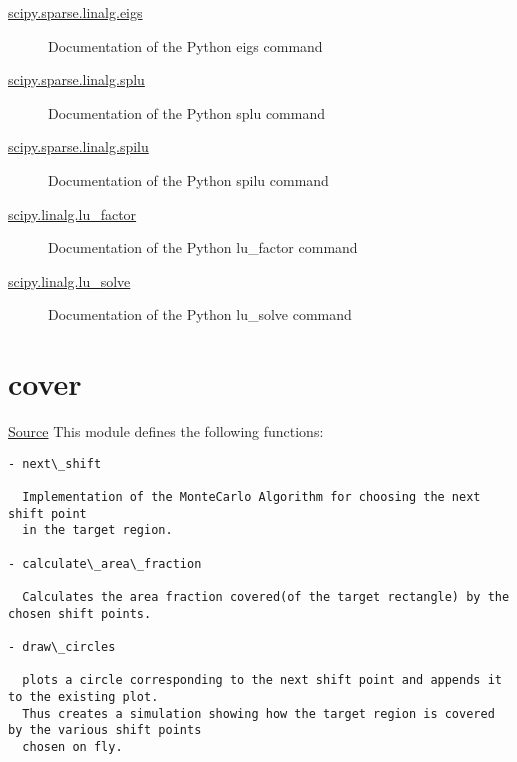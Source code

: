 \documentclass[letterpaper,10pt,english]{sphinxmanual}
\begin{document}
\begin{description}
\item[{\href{http://docs.scipy.org/doc/scipy-0.14.0/reference/generated/scipy.sparse.linalg.eigs.html}{scipy.sparse.linalg.eigs}}] \leavevmode
Documentation of the Python eigs command

\item[{\href{http://docs.scipy.org/doc/scipy-0.14.0/reference/generated/scipy.sparse.linalg.splu.html}{scipy.sparse.linalg.splu}}] \leavevmode
Documentation of the Python splu command

\item[{\href{http://docs.scipy.org/doc/scipy-0.14.0/reference/generated/scipy.sparse.linalg.spilu.html}{scipy.sparse.linalg.spilu}}] \leavevmode
Documentation of the Python spilu command

\item[{\href{http://docs.scipy.org/doc/scipy-0.14.0/reference/generated/scipy.linalg.lu\_factor.html}{scipy.linalg.lu\_factor}}] \leavevmode
Documentation of the Python lu\_factor command

\item[{\href{http://docs.scipy.org/doc/scipy-0.14.0/reference/generated/scipy.linalg.lu\_solve.html}{scipy.linalg.lu\_solve}}] \leavevmode
Documentation of the Python lu\_solve command

\end{description}




\section{cover}
\label{index:cover}
\href{https://bitbucket.org/akadar/brakesqueal0.1/src/master/brake/solve/cover.py?at=master}{Source}
\label{index:module-brake.solve.cover}
This module defines the following functions:

\begin{Verbatim}[commandchars=\\\{\}]
- next\_shift

  Implementation of the MonteCarlo Algorithm for choosing the next shift point 
  in the target region.

- calculate\_area\_fraction

  Calculates the area fraction covered(of the target rectangle) by the chosen shift points.
  
- draw\_circles

  plots a circle corresponding to the next shift point and appends it to the existing plot.
  Thus creates a simulation showing how the target region is covered by the various shift points
  chosen on fly.
\end{Verbatim}
\end{document}
